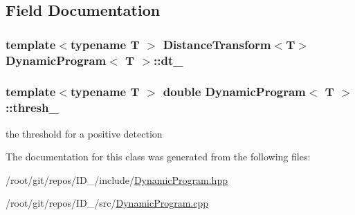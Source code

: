 \subsection{\-Field \-Documentation}
\hypertarget{classDynamicProgram_a6cea0b8559d6a03d81e2003991ab67cf}{
\subsubsection[{dt\-\_\-}]{\setlength{\rightskip}{0pt plus 5cm}template$<$typename T $>$ {\bf \-Distance\-Transform}$<$\-T$>$ {\bf \-Dynamic\-Program}$<$ \-T $>$\-::{\bf dt\-\_\-}}}\label{classDynamicProgram_a6cea0b8559d6a03d81e2003991ab67cf}
\hypertarget{classDynamicProgram_a08f2d4801faa0f964e217b9ac9927ec6}{
\subsubsection[{thresh\-\_\-}]{\setlength{\rightskip}{0pt plus 5cm}template$<$typename T $>$ double {\bf \-Dynamic\-Program}$<$ \-T $>$\-::{\bf thresh\-\_\-}}}\label{classDynamicProgram_a08f2d4801faa0f964e217b9ac9927ec6}


the threshold for a positive detection 



\-The documentation for this class was generated from the following files\-:\begin{DoxyCompactItemize}
\item 
/root/git/repos/\-I\-D\-\_/include/\hyperlink{DynamicProgram_8hpp}{\-Dynamic\-Program.\-hpp}\item 
/root/git/repos/\-I\-D\-\_/src/\hyperlink{DynamicProgram_8cpp}{\-Dynamic\-Program.\-cpp}\end{DoxyCompactItemize}
